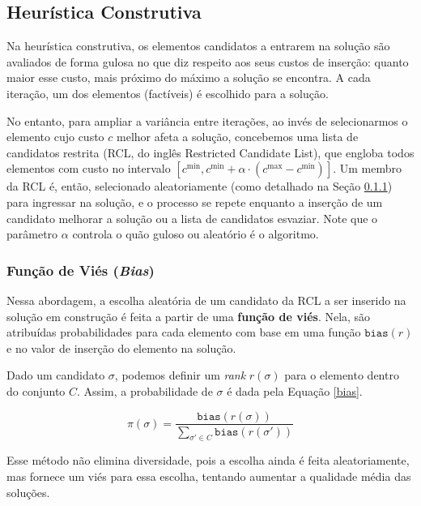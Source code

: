 \documentclass{MO824}
\begin{document}
    \subsection{Heurística Construtiva}

    Na heurística construtiva, os elementos candidatos a entrarem na solução são avaliados de forma gulosa no que diz respeito aos seus custos de inserção: quanto maior esse custo, mais próximo do máximo a solução se encontra. A cada iteração, um dos elementos (factíveis) é escolhido para a solução.
    
    No entanto, para ampliar a variância entre iterações, ao invés de selecionarmos o elemento cujo custo $c$ melhor afeta a solução, concebemos uma lista de candidatos restrita (RCL, do inglês Restricted Candidate List), que engloba todos elementos com custo no intervalo $[c^{\text{min}}, c^{\text{min}} + \alpha \cdot (c^{\text{max}} - c^{\text{min}})]$. Um membro da RCL é, então, selecionado aleatoriamente (como detalhado na Seção \ref{random}) para ingressar na solução, e o processo se repete enquanto a inserção de um candidato melhorar a solução ou a lista de candidatos esvaziar. Note que o parâmetro $\alpha$ controla o quão guloso ou aleatório é o algoritmo.

    \subsubsection{Função de Viés (\textit{Bias})} \label{random}

    Nessa abordagem, a escolha aleatória de um candidato da RCL a ser inserido na solução em construção é feita a partir de uma \textbf{função de viés}. Nela, são atribuídas probabilidades para cada elemento com base em uma função $\texttt{bias}(r)$ e no valor de inserção do elemento na solução. 
    
    Dado um candidato $\sigma$, podemos definir um \textit{rank} $r(\sigma)$ para o elemento dentro do conjunto $C$. Assim, a probabilidade de $\sigma$ é dada pela Equação \eqref{bias}.
    
    \begin{equation} \label{bias}
        \pi(\sigma) = \frac{\texttt{bias}(r(\sigma))}{\sum_{\sigma' \in C} \texttt{bias}(r(\sigma'))}
    \end{equation}
    
    Esse método não elimina diversidade, pois a escolha ainda é feita aleatoriamente, mas fornece um viés para essa escolha, tentando aumentar a qualidade média das soluções.
    
\end{document}
